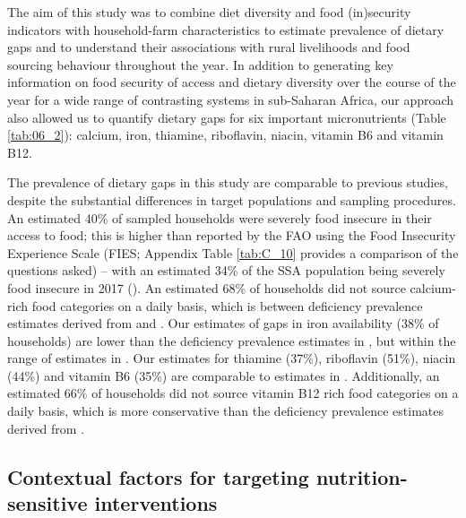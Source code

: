 The aim of this study was to combine diet diversity and food (in)security indicators with household-farm characteristics to estimate prevalence of dietary gaps and to understand their associations with rural livelihoods and food sourcing behaviour throughout the year. In addition to generating key information on food security of access and dietary diversity over the course of the year for a wide range of contrasting systems in sub-Saharan Africa, our approach also allowed us to quantify dietary gaps for six important micronutrients (Table \ref{tab:06_2}): calcium, iron, thiamine, riboflavin, niacin, vitamin B6 and vitamin B12.

The prevalence of dietary gaps in this study are comparable to previous studies, despite the substantial differences in target populations and sampling procedures. An estimated 40\% of sampled households were severely food insecure in their access to food; this is higher than reported by the FAO using the Food Insecurity Experience Scale (FIES; Appendix Table \ref{tab:C_10} provides a comparison of the questions asked) -- with an estimated 34\% of the SSA population being severely food insecure in 2017 (\citealp{FAO2018}). An estimated 68\% of households did not source calcium-rich food categories on a daily basis, which is between deficiency prevalence estimates derived from \citet[calculated as the inverse weighted average of the probability of adequacy -- Appendix Table \ref{tab:C_11}; calcium deficiency prevalence was 91\% of sampled women in Burkina faso, Mali and Uganda]{Martin-Prevel2015} and \citet[54\% of individuals in Africa]{Joy2014}. Our estimates of gaps in iron availability (38\% of households) are lower than the deficiency prevalence estimates in \citet[78\%]{Martin-Prevel2015}, but within the range of estimates in \citet[whose estimates range from 5\% assuming low bioavailability (10\% available), to 43\% for very low bio-availability (5\% available)]{Joy2014}. Our estimates for thiamine (37\%), riboflavin (51\%), niacin (44\%) and vitamin B6 (35\%) are comparable to estimates in \citet[thiamine 32\%, riboflavin 56\% and niacin 34\%, vitamin B6 26\%]{Martin-Prevel2015}. Additionally, an estimated 66\% of households did not source vitamin B12 rich food categories on a daily basis, which is more conservative than the deficiency prevalence estimates derived from \citet[93\% of sampled women]{Martin-Prevel2015}.

\subsection{Contextual factors for targeting nutrition-sensitive interventions}

